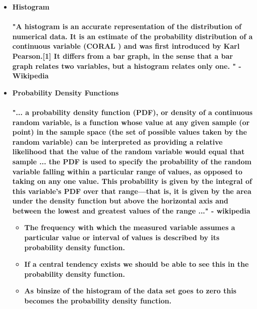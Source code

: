 \documentclass[11pt]{article}
\newcommand{\B}{\color{blue}}
\newcommand{\G}{\color{mygreen}}
\newcommand{\PR}{\color{mypurple}}
\begin{document}
\begin{itemize}
\begin{itemize}
	\end{itemize}
		
		
		\newpage
		\item \textbf{ \LARGE Histogram } \\\\ 
			\textbf{ \large "A histogram is an accurate representation of the distribution of numerical data. It is an estimate of the probability distribution of a continuous variable (CORAL ) and was first introduced by Karl Pearson.[1] It differs from a bar graph, in the sense that a bar graph relates two variables, but a histogram relates only one. " - Wikipedia }\\
		\item \textbf{ \LARGE Probability Density Functions  } \\\\ 
\textbf{ \large "... a probability density function (PDF), or density of a continuous random variable, is a function whose value at any given sample (or point) in the sample space (the set of possible values taken by the random variable) can be interpreted as providing a relative likelihood that the value of the random variable would equal that sample ... the PDF is used to specify the probability of the random variable falling within a particular range of values, as opposed to taking on any one value. This probability is given by the integral of this variable's PDF over that range—that is, it is given by the area under the density function but above the horizontal axis and between the lowest and greatest values of the range ..." - wikipedia }\\
		\begin{itemize}
			\item \textbf{ \large The frequency with which the measured variable assumes a particular value or interval of values is described by its {\bf \B probability density function}.} \\

                               \item \textbf{ \large If a {\bf \PR central tendency} exists we should be able to see this in the {\bf \B probability density function}.} \\
                               
                               \item \textbf{ \large As binsize of the {\bf \G histogram} of the data set goes to zero this becomes the {\bf \B probability density function}.} \\ 
                                

\end{itemize}
\end{itemize}
\end{document}
